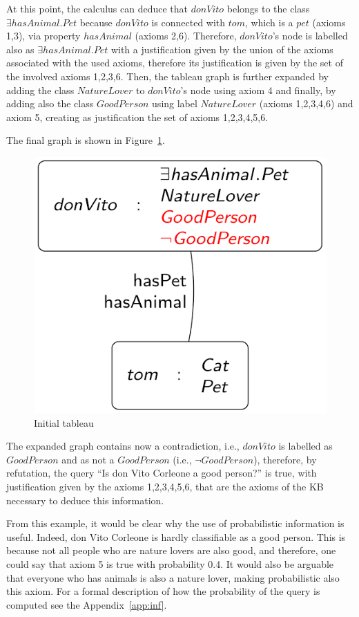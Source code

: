 At this point, the calculus can deduce that $donVito$ belongs to the class \linebreak $\exists hasAnimal.Pet$ because $donVito$ is connected with $tom$, which is a $pet$ (axioms {1,3}), via property $hasAnimal$ (axioms {2,6}). Therefore, $donVito$’s node is labelled also as $\exists hasAnimal.Pet$ with a justification given by the union of the axioms associated with the used axioms, therefore its justification is given by the set of the involved axioms {1,2,3,6}. Then, the tableau graph is further expanded by adding the class $NatureLover$ to $donVito$’s node using axiom 4 and finally, by adding also the class $GoodPerson$ using label $NatureLover$ (axioms {1,2,3,4,6}) and axiom 5, creating as justification the set of axioms {1,2,3,4,5,6}.

The final graph is shown in Figure~\ref{fig:tab2}.
\begin{figure}
	\centering
	\includegraphics[width=0.5\linewidth]{img/tab2}
	\caption{Initial tableau}
	\label{fig:tab2}
\end{figure}
The expanded graph contains now a contradiction, i.e., $donVito$ is labelled as $GoodPerson$ and as not a $GoodPerson$ (i.e., $\neg GoodPerson$), therefore, by refutation, the query ``Is don Vito Corleone a good person?'' is true, with justification given by the axioms {1,2,3,4,5,6}, that are the axioms of the KB necessary to deduce this information.

From this example, it would be clear why the use of probabilistic information is useful. Indeed, don Vito Corleone is hardly classifiable as a good person. This is because not all people who are nature lovers are also good, and therefore, one could say that axiom 5 is true with probability 0.4. It would also be arguable that everyone who has animals is also a nature lover, making probabilistic also this axiom. For a formal description of how the probability of the query is computed see the Appendix~\ref{app:inf}.